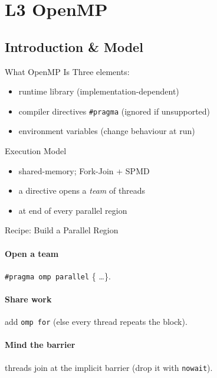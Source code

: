 \section{L3 OpenMP}

\subsection{Introduction \& Model}


\begin{definition}{What OpenMP Is}
    Three elements:
    \begin{itemize}
        \item runtime library (implementation-dependent)
        \item compiler directives \texttt{\#pragma} (ignored if unsupported)
        \item environment variables (change behaviour at run)
    \end{itemize}
\end{definition}

\begin{concept}{Execution Model}
    \begin{itemize}
        \item shared-memory; Fork-Join + SPMD
        \item a directive opens a \emph{team} of threads
        \item {} at end of every parallel region
    \end{itemize}
\end{concept}

\multend


\begin{KR}{Recipe: Build a Parallel Region}
    \paragraph{Open a team} \texttt{\#pragma omp parallel} \{ \ldots \}.
    \paragraph{Share work} add \texttt{omp for} (else every thread repeats the block).
    \paragraph{Mind the barrier} threads join at the implicit barrier (drop it with \texttt{nowait}).
\end{KR}

